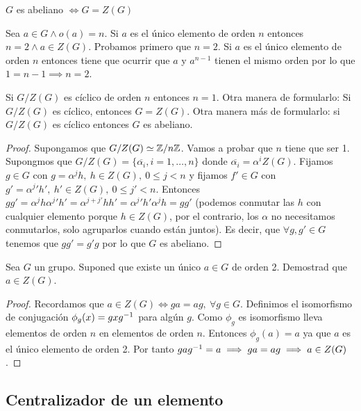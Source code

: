 \begin{pro}
	$G$ es abeliano $\iff G = Z(G)$
\end{pro}

Sea $a \in G \land o(a) = n$. Si $a$ es el único elemento de orden $n$ entonces $n = 2 \land a \in Z(G)$. Probamos primero que $n=2$. Si $a$ es el único elemento de orden $n$ entonces tiene que ocurrir que $a$ y $a^{n-1}$ tienen el mismo orden por lo que $1 = n-1 \implies n = 2$.

\begin{pro}
	\label{pro:triplecentro}
	Si $G/Z(G)$ es cíclico de orden $n$ entonces $n = 1$. Otra manera de formularlo: Si $G/Z(G)$ es cíclico, entonces $G = Z(G)$. Otra manera más de formularlo: si $G/Z(G)$ es cíclico entonces $G$ es abeliano.
\end{pro}

\begin{proof}
	Supongamos que $G/Z(G) \simeq \mathbb{Z}/n\mathbb{Z}$. Vamos a probar que $n$ tiene que ser 1. Supongmos que $G/Z(G) = \{\overline{\alpha_i}, i = 1, \dots, n\}$ donde $\overline{\alpha_i} = \alpha^i Z(G)$. Fijamos $g \in G$ con $g = \alpha^j h,\ h \in Z(G),\ 0 \leq j < n$ y fijamos $f' \in G$ con $g' = {\alpha^j}' h',\ h' \in Z(G),\ 0 \leq j' < n$. Entonces $gg' = \alpha^j h{\alpha^j}' h' = \alpha^{j+j'}hh' = {\alpha^j}' h' \alpha^j h = gg'$ (podemos conmutar las $h$ con cualquier elemento porque $h \in Z(G)$, por el contrario, los $\alpha$ no necesitamos conmutarlos, solo agruparlos cuando están juntos). Es decir, que $\forall g, g' \in G$ tenemos que $gg' = g'g$ por lo que $G$ es abeliano.
\end{proof}


\begin{ex}[H1.33]
	Sea $G$ un grupo. Suponed que existe un único $a \in G$ de orden 2. Demostrad que $a \in Z(G)$.
\end{ex}

\begin{proof}
	Recordamos que $a \in Z(G) \iff ga = ag,\ \forall g \in G$. Definimos el isomorfismo de conjugación $\phi_g (x) = gxg^{-1}$ para algún $g$. Como $\phi_g$ es isomorfismo lleva elementos de orden $n$ en elementos de orden $n$. Entonces $\phi_g(a) = a$ ya que $a$ es el único elemento de orden 2. Por tanto $gag^{-1} = a \implies ga = ag \implies a \in Z(G)$.
\end{proof}

\subsection{Centralizador de un elemento}

